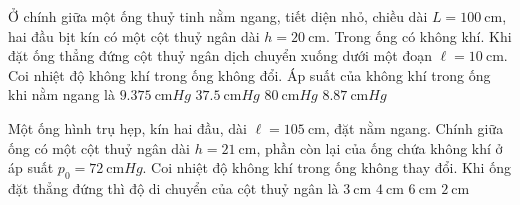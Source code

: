 \begin{ex}
Ở chính giữa một ống thuỷ tinh nằm ngang, tiết diện nhỏ, chiều dài $L=\SI{100}{\centi\meter}$, hai đầu bịt kín có một cột thuỷ ngân dài $h=\SI{20}{\centi\meter}$. Trong ống có không khí. Khi đặt ống thẳng đứng cột thuỷ ngân dịch chuyển xuống dưới một đoạn $\ell=\SI{10}{\centi\meter}$. Coi nhiệt độ không khí trong ống không đổi. Áp suất của không khí trong ống khi nằm ngang là	
	\choice
	{$\SI{9.375}{\centi\meter Hg}$}
	{\True $\SI{37.5}{\centi\meter Hg}$}
	{$\SI{80}{\centi\meter Hg}$}
	{$\SI{8.87}{\centi\meter Hg}$}
\end{ex}
\begin{ex}
	Một ống hình trụ hẹp, kín hai đầu, dài $\ell=\SI{105}{\centi\meter}$, đặt nằm ngang. Chính giữa ống có một cột thuỷ ngân dài $h=\SI{21}{\centi\meter}$, phần còn lại của ống chứa không khí ở áp suất $p_0=\SI{72}{\centi\meter Hg}$. Coi nhiệt độ không khí trong ống không thay đổi. Khi ống đặt thẳng đứng thì độ di chuyển của cột thuỷ ngân là
	\choice
	{$\SI{3}{\centi\meter}$}
	{$\SI{4}{\centi\meter}$}
	{\True $\SI{6}{\centi\meter}$}
	{$\SI{2}{\centi\meter}$}
\end{ex}

